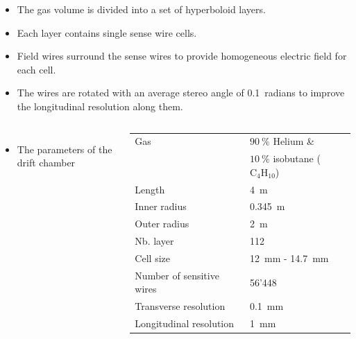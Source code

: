 \documentclass[final,xcolor={dvipsnames,svgnames,x11names,table}]{beamer}
\begin{document}
\begin{frame}
\begin{textblock}{43}
\begin{tcolorbox}[title=The IDEA drift chamber]
    \begin{itemize}
      \item The gas volume is divided into a set of hyperboloid layers. \vspace{0.2cm}
      \item Each layer contains single sense wire cells. \vspace{0.2cm}
      \item Field wires surround the sense wires to provide homogeneous electric field for each cell. \vspace{0.2cm}
      \item The wires are rotated with an average stereo angle of 0.1~radians to improve the longitudinal resolution along them. \vspace{0.2cm}
    \end{itemize}

    \begin{columns}
      \begin{itemize}
        \item The parameters of the drift chamber \vspace{0.5cm}
      \end{itemize}

      \centering
      \begin{adjustbox}{max width=0.8\textwidth}
        \begin{tabular}{l l}
          \toprule
            Gas & $90~\%$ Helium \&\\
            & $10~\%$ isobutane ($\text{C}_{4}\text{H}_{10}$) \\
            Length & 4~m \\
            Inner radius & 0.345~m \\
            Outer radius & 2~m\\
            Nb. layer & 112 \\
            Cell size & 12~mm - 14.7~mm \\
            Number of sensitive wires & 56'448 \\
            Transverse resolution & 0.1~mm \\
            Longitudinal resolution & 1~mm \\
          \bottomrule
        \end{tabular}
      \end{adjustbox}


\end{columns}
\end{tcolorbox}
\end{textblock}
\end{frame}
\end{document}

